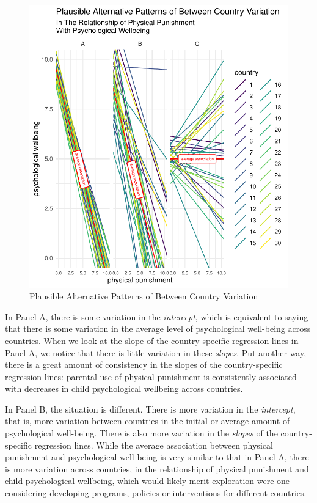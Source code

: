 \documentclass[
  letterpaper,
  DIV=11,
  numbers=noendperiod]{scrreprt}
\begin{document}
\begin{figure}[H]

{\centering \includegraphics{./intro_files/figure-pdf/fig-variation1-1.pdf}

}

\caption{\label{fig-variation1}Plausible Alternative Patterns of Between
Country Variation}

\end{figure}

In Panel A, there is some variation in the \emph{intercept}, which is
equivalent to saying that there is some variation in the average level
of psychological well-being across countries. When we look at the slope
of the country-specific regression lines in Panel A, we notice that
there is little variation in these \emph{slopes}. Put another way, there
is a great amount of consistency in the slopes of the country-specific
regression lines: parental use of physical punishment is consistently
associated with decreases in child psychological wellbeing across
countries.

In Panel B, the situation is different. There is more variation in the
\emph{intercept}, that is, more variation between countries in the
initial or average amount of psychological well-being. There is also
more variation in the \emph{slopes} of the country-specific regression
lines. While the average association between physical punishment and
psychological well-being is very similar to that in Panel A, there is
more variation across countries, in the relationship of physical
punishment and child psychological wellbeing, which would likely merit
exploration were one considering developing programs, policies or
interventions for different countries.
\end{document}
